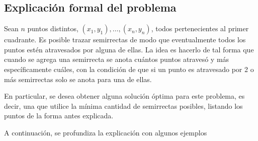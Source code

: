 \subsection{Explicación formal del problema}
Sean $n$ puntos distintos, $(x_1, y_1), \hdots, (x_n, y_n)$, todos pertenecientes al primer cuadrante. Es posible trazar semirrectas de modo que eventualmente todos los puntos estén atravesados por alguna de ellas. La idea es hacerlo de tal forma que cuando se agrega una semirrecta se anota cuántos puntos atravesó y más específicamente cuáles, con la condición de que si un punto es atravesado por 2 o más semirrectas solo se anota para una de ellas. 

En particular, se desea obtener alguna solución óptima para este problema, es decir, una que utilice la mínima cantidad de semirrectas posibles, listando los puntos de la forma antes explicada. 


A continuación, se profundiza la explicación con algunos ejemplos 

